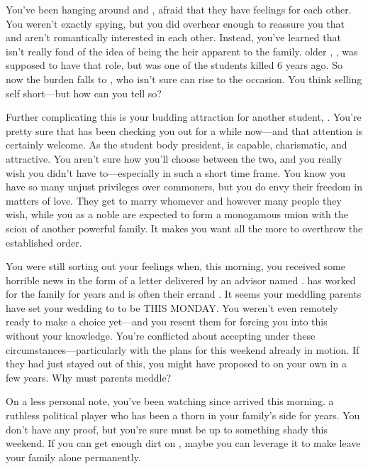 \documentclass[char]{GL2020}
\begin{document}
You've been hanging around \cHeir{} and \cAmbition{}, afraid that they have feelings for each other. You weren't exactly spying, but you did overhear enough to reassure you that \cAmbition{} and \cHeir{} aren't romantically interested in each other. Instead, you've learned that \cHeir{} isn't really fond of the idea of being the heir apparent to the \cHeir{\formal} family. \cHeir{\Their} older \cHeirSibling{\sibling}, \cHeirSibling{}, was supposed to have that role, but \cHeirSibling{} was one of the students killed 6 years ago. So now the burden falls to \cHeir{}, who isn't sure \cHeir{\they} can rise to the occasion. You think \cHeir{\theyare} selling \cHeir{\them}self short---but how can you tell \cHeir{\them} so?

Further complicating this is your budding attraction for another student, \cPresident{}. You're pretty sure that \cPresident{} has been checking you out for a while now---and that attention is certainly welcome. As the student body president, \cPresident{} is capable, charismatic, and attractive. You aren't sure how you'll choose between the two, and you really wish you didn't have to---especially in such a short time frame. You know you have so many unjust privileges over commoners, but you do envy their freedom in matters of love. They get to marry whomever and however many people they wish, while you as a noble are expected to form a monogamous union with the scion of another powerful family. It makes you want all the more to overthrow the established order.

You were still sorting out your feelings when, this morning, you received some horrible news in the form of a letter delivered by an advisor named \cDiplomat{\full}. \cDiplomat{} has worked for the \cHeir{\formal} family for years and is often their errand \cDiplomat{\kid}. It seems your meddling parents have set your wedding to \cHeir{} to be THIS MONDAY. You weren't even remotely ready to make a choice yet---and you resent them for forcing you into this without your knowledge. You're conflicted about accepting under these circumstances---particularly with the \pGoaties{} plans for this weekend already in motion. If they had just stayed out of this, you might have proposed to \cHeir{} on your own in a few years. Why must parents meddle?
 
On a less personal note, you've been watching \cEvil{\full} since \cEvil{\they} arrived this morning. \cEvil{\Theyare} a ruthless political player who has been a thorn in your family's side for years. You don't have any proof, but you're sure \cEvil{\they} must be up to something shady this weekend. If you can get enough dirt on \cEvil{\them}, maybe you can leverage it to make \cEvil{\them} leave your family alone permanently. 
 
\end{document}
